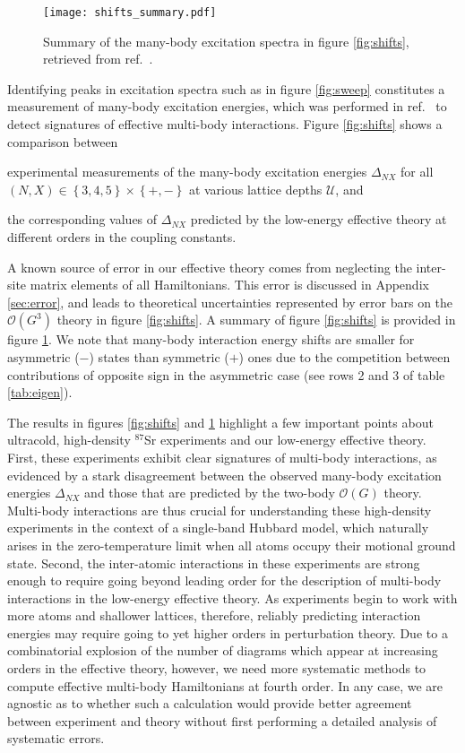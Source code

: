 \documentclass[preprint,showkeys,nofootinbib]{revtex4-1}
\newcommand{\p}[1]{\left(#1\right)} %
\renewcommand{\set}[1]{\left\{#1\right\}} %
\renewcommand{\O}{\mathcal{O}}
\newcommand{\U}{\mathcal{U}}
\newcommand{\1}{\mathds{1}}
\begin{document}
\begin{figure}
  \centering
  \texttt{[image: shifts\_summary.pdf]}
  \caption{\footnotesize Summary of the many-body excitation spectra
    in figure \ref{fig:shifts}, retrieved from
    ref.~\cite{goban2018emergence}.}
  \label{fig:shifts_summary}
\end{figure}

Identifying peaks in excitation spectra such as in figure
\ref{fig:sweep} constitutes a measurement of many-body excitation
energies, which was performed in ref.~\cite{goban2018emergence} to
detect signatures of effective multi-body interactions.  Figure
\ref{fig:shifts} shows a comparison between
\begin{enumerate*}
\item experimental measurements of the many-body excitation energies
  $\Delta_{NX}$ for all $\p{N,X}\in\set{3,4,5}\times\set{+,-}$ at
  various lattice depths $\U$, and
\item the corresponding values of $\Delta_{NX}$ predicted by the
  low-energy effective theory at different orders in the coupling
  constants.
\end{enumerate*}
A known source of error in our effective theory comes from neglecting
the inter-site matrix elements of all Hamiltonians.  This error is
discussed in Appendix \ref{sec:error}, and leads to theoretical
uncertainties represented by error bars on the $\O\p{G^3}$ theory in
figure \ref{fig:shifts}.  A summary of figure \ref{fig:shifts} is
provided in figure \ref{fig:shifts_summary}.  We note that many-body
interaction energy shifts are smaller for asymmetric ($-$) states than
symmetric ($+$) ones due to the competition between contributions of
opposite sign in the asymmetric case (see rows 2 and 3 of table
\ref{tab:eigen}).

The results in figures \ref{fig:shifts} and \ref{fig:shifts_summary}
highlight a few important points about ultracold, high-density
${}^{87}$Sr experiments and our low-energy effective theory.  First,
these experiments exhibit clear signatures of multi-body interactions,
as evidenced by a stark disagreement between the observed many-body
excitation energies $\Delta_{NX}$ and those that are predicted by the
two-body $\O\p{G}$ theory.  Multi-body interactions are thus crucial
for understanding these high-density experiments in the context of a
single-band Hubbard model, which naturally arises in the
zero-temperature limit when all atoms occupy their motional ground
state.  Second, the inter-atomic interactions in these experiments are
strong enough to require going beyond leading order for the
description of multi-body interactions in the low-energy effective
theory.  As experiments begin to work with more atoms and shallower
lattices, therefore, reliably predicting interaction energies may
require going to yet higher orders in perturbation theory.  Due to a
combinatorial explosion of the number of diagrams which appear at
increasing orders in the effective theory, however, we need more
systematic methods to compute effective multi-body Hamiltonians at
fourth order.  In any case, we are agnostic as to whether such a
calculation would provide better agreement between experiment and
theory without first performing a detailed analysis of systematic
errors.
\end{document}
